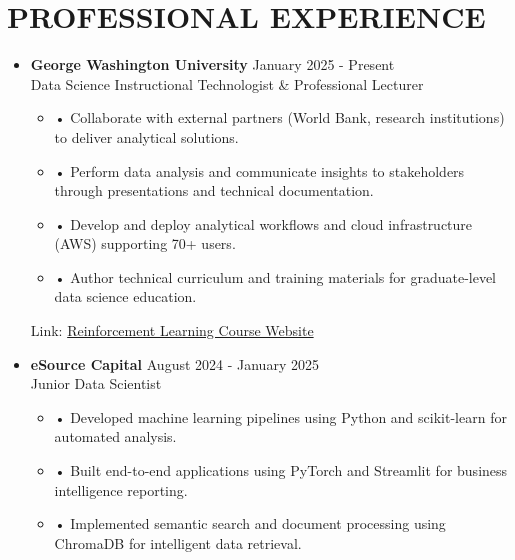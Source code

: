 \documentclass[a4paper,9pt]{extarticle}
\begin{document}

\section*{PROFESSIONAL EXPERIENCE}

\begin{itemize}[leftmargin=0.4cm, label={}]
    \item \textbf{George Washington University} \hfill January 2025 - Present \\
    Data Science Instructional Technologist \& Professional Lecturer
    \vspace{-0.1cm}
    \begin{itemize}[leftmargin=0.3cm, label={}]
    \item \small{•} \normalsize{Collaborate with external partners (World Bank, research institutions) to deliver analytical solutions.}
    \item \small{•} \normalsize{Perform data analysis and communicate insights to stakeholders through presentations and technical documentation.}
    \item \small{•} \normalsize{Develop and deploy analytical workflows and cloud infrastructure (AWS) supporting 70+ users.}
    \item \small{•} \normalsize{Author technical curriculum and training materials for graduate-level data science education.}
    \end{itemize}
    Link: \href{https://twallett.com/courses/reinforcement-learning/}{Reinforcement Learning Course Website}
\end{itemize}

\noindent
\begin{itemize}[leftmargin=0.4cm, label={}]
    \item \textbf{eSource Capital} \hfill August 2024 - January 2025 \\
    Junior Data Scientist 
    \vspace{-0.1cm}
    \begin{itemize}[leftmargin=0.3cm, label={}]
\item \small{•} \normalsize{Developed machine learning pipelines using Python and scikit-learn for automated analysis.}
    \item \small{•} \normalsize{Built end-to-end applications using PyTorch and Streamlit for business intelligence reporting.}
    \item \small{•} \normalsize{Implemented semantic search and document processing using ChromaDB for intelligent data retrieval.}
    \end{itemize}
\end{itemize}
\end{document}
